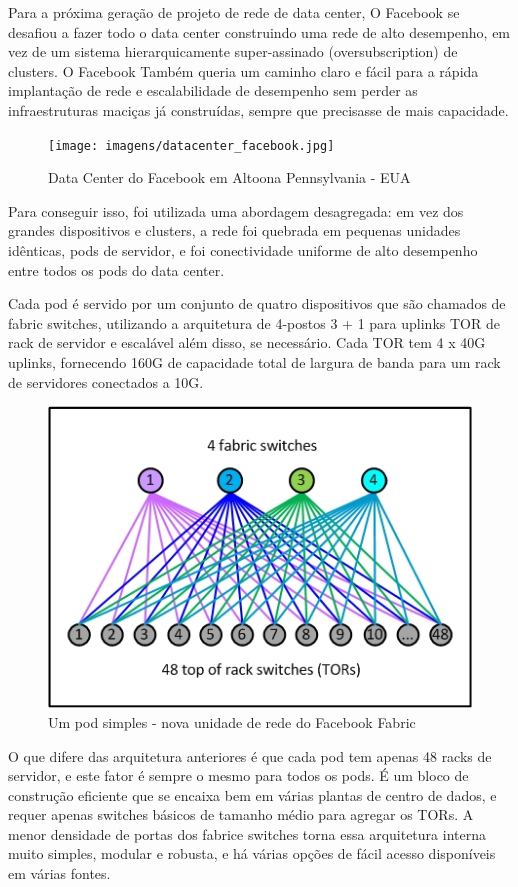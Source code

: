 \documentclass[12pt,a4paper]{report}
\begin{document}
Para a próxima geração de projeto de rede de data center, O Facebook se desafiou a fazer todo o data center construindo uma rede de alto desempenho, em vez de um sistema hierarquicamente super-assinado (oversubscription) de clusters. 
O Facebook Também queria um caminho claro e fácil para a rápida implantação de rede e escalabilidade de desempenho sem perder as
infraestruturas maciças já construídas, sempre que precisasse de mais capacidade.

\begin{figure}[H]
\centering
\texttt{[image: imagens/datacenter\_facebook.jpg]}
\caption{Data Center do Facebook em Altoona Pennsylvania - EUA}
\label{face1}
\end{figure}

Para conseguir isso, foi utilizada uma abordagem desagregada: 
em vez dos grandes dispositivos e clusters, 
a rede foi quebrada em pequenas unidades idênticas, 
pods de servidor, e foi conectividade uniforme de alto desempenho entre todos os pods do data center.


Cada pod é servido por um conjunto de quatro dispositivos que são chamados de fabric switches, utilizando a arquitetura de 4-postos 3 + 1 para 
uplinks TOR de rack de servidor e escalável além disso, se necessário. Cada TOR tem  4 x 40G uplinks, 
fornecendo 160G de capacidade total de largura de banda para um rack de servidores conectados a 10G.

\begin{figure}[H]
\centering
\includegraphics[width=.7\textwidth]{imagens/pod.jpg}
\caption{Um pod simples - nova unidade de rede do Facebook Fabric}
\label{face2}
\end{figure}


O que difere das arquitetura anteriores é que cada pod tem apenas 48 racks de servidor, 
e este fator é sempre o mesmo para todos os pods. 
É um bloco de construção eficiente que se encaixa bem em várias plantas de centro de dados,
e requer apenas switches básicos de tamanho médio para agregar os TORs. 
A menor densidade de portas dos fabrice switches torna essa arquitetura interna muito simples, 
modular e robusta, e há várias opções de fácil acesso disponíveis em várias fontes.
\end{document}
